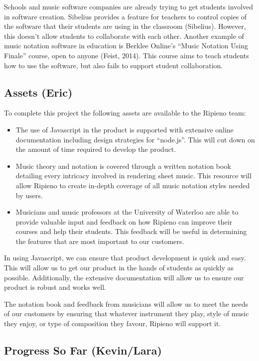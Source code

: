 \documentclass[12pt]{article}
\begin{document}
Schools and music software companies are already trying to get students involved in software creation.  Sibelius provides a feature for teachers to control copies of the software that their students are using in the classroom (Sibelius).  However, this doesn't allow students to collaborate with each other.  Another example of music notation software in education is Berklee Online's ``Music Notation Using Finale'' course, open to anyone (Feist, 2014).  This course aims to teach students how to use the software, but also fails to support student collaboration.

\subsection{Assets (Eric)}
To complete this project the following assets are available to the Ripieno team:
\begin{itemize}
\item The use of Javascript in the product is supported with extensive online documentation including design strategies for ``node.js''. This will cut down on the amount of time required to develop the product.
\item Music theory and notation is covered through a written notation book detailing every intricacy involved in rendering sheet music. This resource will allow Ripieno to create in-depth coverage of all music notation styles needed by users.
\item Musicians and music professors at the University of Waterloo are able to provide valuable input and feedback on how Ripieno can improve their courses and help their students.  This feedback will be useful in determining the features that are most important to our customers.
\end{itemize}

In using Javascript, we can ensure that product development is quick and easy. This will allow us to get our product in the hands of students as quickly as possible. Additionally, the extensive documentation will allow us to ensure our product is robust and works well.

The notation book and feedback from musicians will allow us to meet the needs of our customers by ensuring that whatever instrument they play, style of music they enjoy, or type of composition they favour, Ripieno will support it.

\subsection{Progress So Far (Kevin/Lara)}
\end{document}
